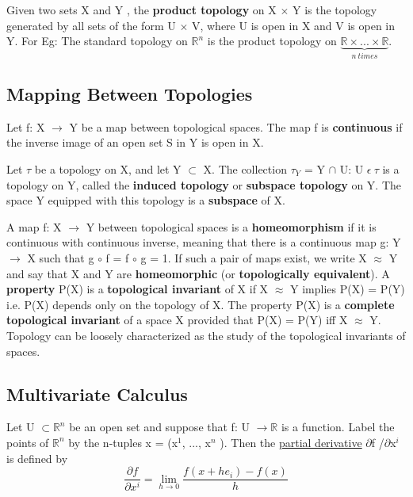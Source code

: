 Given two sets X and Y , the \textbf{product topology} on X $\times$ Y is the topology generated
by all sets of the form U $\times$ V, where U is open in X and V is open in Y. 
For Eg: The standard topology on $\mathbb{R}^n$ is the product topology on $\underbrace{\mathbb{R} \times ... \times \mathbb{R}}_{n \:times}$.

\subsection{Mapping Between Topologies}
Let f: X $\rightarrow$ Y be a map between topological spaces. The map f is \textbf{continuous}
if the inverse image of an open set S in Y is open in X.

Let $\tau$ be a topology on X, and let Y $\subset$ X. 
The collection $\tau_Y$ = {Y $\cap$ U: U $\epsilon \: \tau$} is a topology on Y, called the \textbf{induced topology} or \textbf{subspace topology} on Y. 
The space Y equipped with this topology is a \textbf{subspace} of X.

A map f: X $\rightarrow$ Y between topological spaces is a \textbf{homeomorphism} if it is
continuous with continuous inverse, meaning that there is a continuous map g: Y $\rightarrow$ X  such that g $\circ$ f = f $\circ$ g = 1. 
If such a pair of maps exist, we write X $\approx$ Y and say that X and Y are \textbf{homeomorphic} (or \textbf{topologically equivalent}). 
A \textbf{property} P(X) is a \textbf{topological invariant} of X if X $\approx$ Y implies P(X) = P(Y) i.e.
P(X) depends only on the topology of X. The property P(X) is a \textbf{complete topological invariant} of a space X provided that P(X) = P(Y) iff X $\approx$ Y. 
Topology can be loosely characterized as the study of the topological invariants of spaces.

\subsection{Multivariate Calculus} \label{Multivariable Calculus}
Let U $\subset \mathbb{R}^n$ be an open set and suppose that f: U $\rightarrow \mathbb{R}$ is a function. 
Label the points of $\mathbb{R}^n$ by the n-tuples x = (x$^1$, ..., x$^n$ ). Then the \href{https://en.wikipedia.org/wiki/Partial_derivative}{partial derivative} $\partial$f /$\partial$x$^i$
is defined by
\begin{equation}
    \frac{\partial f}{\partial x^i} = \lim_{h \rightarrow 0} \frac{f(x+he_i) - f(x)}{h}
\end{equation}

